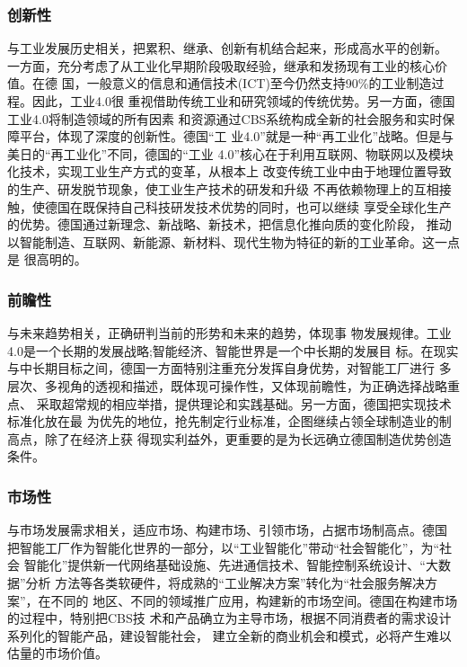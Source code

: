\documentclass[11pt]{ctexart}
\begin{document}
{{{{\subsubsection{创新性}
\label{sec:org2cf1a38}

与工业发展历史相关，把累积、继承、创新有机结合起来，形成高水平的创新。
一方面，充分考虑了从工业化早期阶段吸取经验，继承和发扬现有工业的核心价值。在德
国，一般意义的信息和通信技术(ICT)至今仍然支持90\%的工业制造过程。因此，工业4.0很
重视借助传统工业和研究领域的传统优势。另一方面，德国工业4.0将制造领域的所有因素
和资源通过CBS系统构成全新的社会服务和实时保障平台，体现了深度的创新性。德国“工
业4.0”就是一种“再工业化”战略。但是与美日的“再工业化”不同，德国的“工业
4.0”核心在于利用互联网、物联网以及模块化技术，实现工业生产方式的变革，从根本上
改变传统工业中由于地理位置导致的生产、研发脱节现象，使工业生产技术的研发和升级
不再依赖物理上的互相接触，使德国在既保持自己科技研发技术优势的同时，也可以继续
享受全球化生产的优势。德国通过新理念、新战略、新技术，把信息化推向质的变化阶段，
推动以智能制造、互联网、新能源、新材料、现代生物为特征的新的工业革命。这一点是
很高明的。

\subsubsection{前瞻性}
\label{sec:org3d30f7c}

与未来趋势相关，正确研判当前的形势和未来的趋势，体现事
物发展规律。工业4.0是一个长期的发展战略;智能经济、智能世界是一个中长期的发展目
标。在现实与中长期目标之间，德国一方面特别注重充分发挥自身优势，对智能工厂进行
多层次、多视角的透视和描述，既体现可操作性，又体现前瞻性，为正确选择战略重点、
采取超常规的相应举措，提供理论和实践基础。另一方面，德国把实现技术标准化放在最
为优先的地位，抢先制定行业标准，企图继续占领全球制造业的制高点，除了在经济上获
得现实利益外，更重要的是为长远确立德国制造优势创造条件。

\subsubsection{市场性}
\label{sec:org9ddf15c}

与市场发展需求相关，适应市场、构建市场、引领市场，占据市场制高点。德国
把智能工厂作为智能化世界的一部分，以“工业智能化”带动“社会智能化”，为“社会
智能化”提供新一代网络基础设施、先进通信技术、智能控制系统设计、“大数据”分析
方法等各类软硬件，将成熟的“工业解决方案”转化为“社会服务解决方案”，在不同的
地区、不同的领域推广应用，构建新的市场空间。德国在构建市场的过程中，特别把CBS技
术和产品确立为主导市场，根据不同消费者的需求设计系列化的智能产品，建设智能社会，
建立全新的商业机会和模式，必将产生难以估量的市场价值。

}}}}
\end{document}
